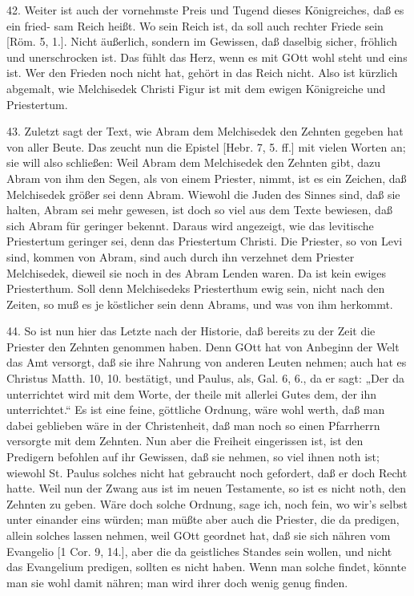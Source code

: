42. Weiter ist auch der vornehmste Preis und Tugend dieses Königreiches, daß es ein fried- sam Reich heißt. Wo sein Reich ist, da soll auch rechter Friede sein [Röm. 5, 1.]. Nicht äußerlich, sondern im Gewissen, daß daselbig sicher, fröhlich und unerschrocken ist. Das fühlt das Herz, wenn es mit GOtt wohl steht und eins ist. Wer den Frieden noch nicht hat, gehört in das Reich nicht. Also ist kürzlich abgemalt, wie Melchisedek Christi Figur ist mit dem ewigen Königreiche und Priestertum.

43. Zuletzt sagt der Text, wie Abram dem Melchisedek den Zehnten gegeben hat von aller Beute. Das zeucht nun die Epistel [Hebr. 7, 5. ff.] mit vielen Worten an; sie will also schließen: Weil Abram dem Melchisedek den Zehnten gibt, dazu Abram von ihm den Segen, als von einem Priester, nimmt, ist es ein Zeichen, daß Melchisedek größer sei denn Abram. Wiewohl die Juden des Sinnes sind, daß sie halten, Abram sei mehr gewesen, ist doch so viel aus dem Texte bewiesen, daß sich Abram für geringer bekennt. Daraus wird angezeigt, wie das levitische Priestertum geringer sei, denn das Priestertum Christi. Die Priester, so von Levi sind, kommen von Abram, sind auch durch ihn verzehnet dem Priester Melchisedek, dieweil sie noch in des
Abram Lenden waren. Da ist kein ewiges Priesterthum. Soll denn Melchisedeks Priesterthum ewig sein, nicht nach den Zeiten, so muß es je köstlicher sein denn Abrams, und was von ihm herkommt.

44. So ist nun hier das Letzte nach der Historie, daß bereits zu der Zeit die Priester den Zehnten genommen haben. Denn GOtt hat von Anbeginn der Welt das Amt versorgt, daß sie ihre Nahrung von anderen Leuten nehmen; auch hat es Christus Matth. 10, 10. bestätigt, und Paulus, als, Gal. 6, 6., da er sagt: „Der da unterrichtet wird mit dem Worte, der theile mit allerlei Gutes dem, der ihn unterrichtet.“ Es ist eine feine, göttliche Ordnung, wäre wohl werth, daß man dabei geblieben wäre in der Christenheit, daß man noch so einen Pfarrherrn versorgte mit dem Zehnten. Nun aber die Freiheit eingerissen ist, ist den Predigern befohlen auf ihr Gewissen, daß sie nehmen, so viel ihnen noth ist; wiewohl St. Paulus solches nicht hat gebraucht noch gefordert, daß er doch Recht hatte. Weil nun der Zwang aus ist im neuen Testamente, so ist es nicht noth, den Zehnten zu geben. Wäre doch solche Ordnung, sage ich, noch fein, wo wir’s selbst unter einander eins würden; man müßte aber auch die Priester, die da predigen, allein solches lassen nehmen, weil GOtt geordnet hat, daß sie sich nähren vom Evangelio [1 Cor. 9, 14.], aber die da geistliches Standes sein wollen, und nicht das Evangelium predigen, sollten es nicht haben. Wenn man solche findet, könnte man sie wohl damit nähren; man wird ihrer doch wenig genug finden.

